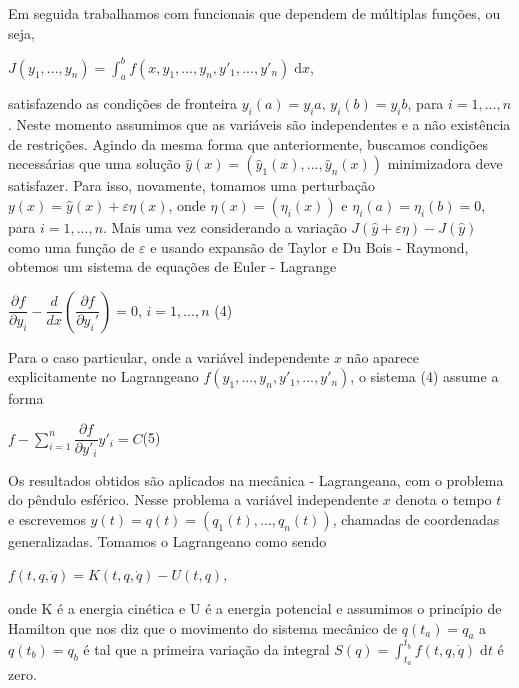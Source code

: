 \documentclass[12pt, a4paper]{article}
\begin{document}
Em seguida trabalhamos com funcionais que dependem de múltiplas funções, ou seja,

\begin{center}
$J(y_1, ... , y_n) = \int_a^b f(x,y_1, ... , y_n, y'_1, ... , y'_n) \; \mathrm{d}x$,
\end{center}

satisfazendo as condições de fronteira $y_i (a) = y_ia$, $y_i (b) = y_ib$, para $i=1,…,n$. Neste momento assumimos que as variáveis são independentes e a não existência de restrições. Agindo da mesma forma que anteriormente, buscamos condições necessárias que uma solução $\hat{y}(x)=(\hat{y}_1(x),...,\hat{y}_n(x))$ minimizadora deve satisfazer. Para isso, novamente, tomamos uma perturbação $y(x)= \hat{y}(x) + \varepsilon \eta(x)$, onde $\eta(x)=(\eta_i (x))$   e  $\eta_i (a)=\eta_i (b)  = 0$,
para $i =1,...,n$. Mais uma vez considerando a variação $J(\hat{y} + \varepsilon\eta) - J(\hat{y})$ como uma função de $\varepsilon$ e usando expansão de Taylor e Du Bois - Raymond, obtemos um sistema de equações de Euler - Lagrange

\begin{center}
$\dfrac{\partial f}{\partial y_i} - \dfrac{d}{dx}(\dfrac{\partial f}{\partial y_i'}) = 0 $, $ i = 1,...,n$ (4)
\end{center}

Para o caso particular, onde a variável independente $x$ não aparece explicitamente no Lagrangeano $f(y_1,...,y_n,y'_1,...,y'_n)$, o sistema (4) assume a forma

\begin{center}
$f - \sum_{i=1}^{n} \dfrac{\partial f}{\partial y'_i} y'_i = C$(5)
\end{center}

Os resultados obtidos são aplicados na mecânica - Lagrangeana, com o problema do pêndulo esférico. Nesse problema a variável independente $x$ denota o tempo $t$ e escrevemos $y(t)=q(t)=(q_1 (t),…,q_n (t))$, chamadas de coordenadas generalizadas. Tomamos o Lagrangeano como sendo

\begin{center}
$ f(t, q, \dot q) = K(t, q, \dot q) - U(t, q) $,
\end{center}

onde K é a energia cinética e U é a energia potencial e assumimos o princípio de Hamilton que nos diz que o movimento do sistema mecânico de $q(t_a)= q_a$  a  $q(t_b )= q_b$ é tal que a primeira variação da integral $S(q)= \int_{t_a}^{t_b}f(t,q,\dot q)\; \mathrm{d}t$ é zero.
\end{document}
